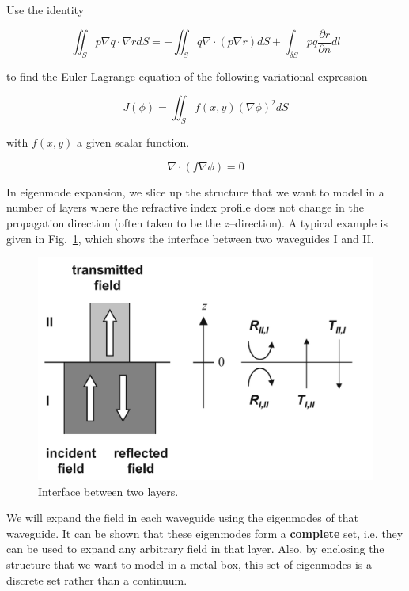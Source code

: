 \begin{exer}
Use the identity

$$\iint_S p \nabla q \cdot \nabla r dS= - \iint_S q \nabla \cdot (p \nabla r) dS + \int_{\delta S} pq \frac{\partial r}{\partial n} dl$$

to find the Euler-Lagrange equation of the following variational expression

$$J(\phi)=\iint_S f(x,y) (\nabla \phi)^2 dS$$

with $f(x,y)$ a given scalar function.

\begin{sol}
$$\nabla \cdot \left( f \nabla \phi \right) = 0 $$
\end{sol}
\end{exer}


\pagebreak


\label{week7}

In eigenmode expansion, we slice up the structure that we want to model in a number of layers where the refractive index profile does not change in the propagation direction (often taken to be the $z$--direction). A typical example is given in Fig.~\ref{fig-interface}, which shows the interface between two waveguides I and II.

\begin{figure}[ht]
\centering
\includegraphics{numeric/figures/interface}
\caption{Interface between two layers.}
\label{fig-interface}
\end{figure}

We will expand the field in each waveguide using the eigenmodes of that waveguide. It can be shown that these eigenmodes form a \textbf{complete} set, i.e. they can be used to expand any arbitrary field in that layer. Also, by enclosing the structure that we want to model in a metal box, this set of eigenmodes is a discrete set rather than a continuum.

